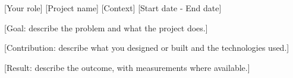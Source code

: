 \Needspace{4cm}


\begin{cventries}

  \cventry
    {[Your role]} %
    {[Project name]} %
    {[Context]} %
    {[Start date - End date]} %
    {
      \begin{cvitems} %
        \item {[Goal: describe the problem and what the project does.]}
        \item {[Contribution: describe what you designed or built and the technologies used.]}
        \item {[Result: describe the outcome, with measurements where available.]}
      \end{cvitems}
    }

\end{cventries}
